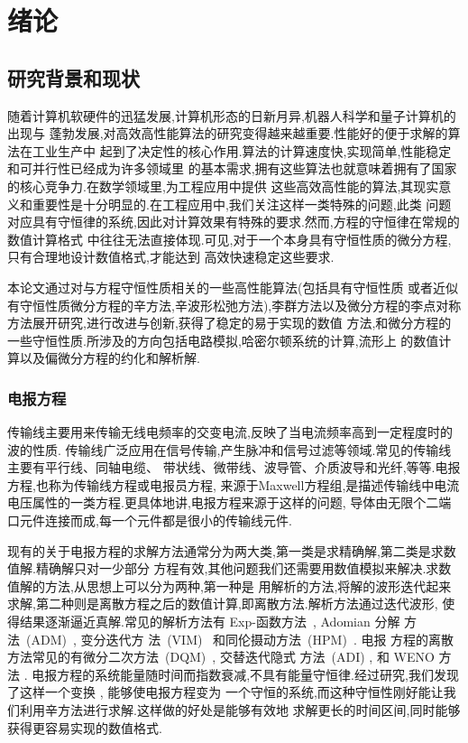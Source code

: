 \chapter{绪论}

\section{研究背景和现状}

随着计算机软硬件的迅猛发展,计算机形态的日新月异,机器人科学和量子计算机的出现与
蓬勃发展,对高效高性能算法的研究变得越来越重要.性能好的便于求解的算法在工业生产中
起到了决定性的核心作用.算法的计算速度快,实现简单,性能稳定和可并行性已经成为许多领域里
的基本需求,拥有这些算法也就意味着拥有了国家的核心竞争力.在数学领域里,为工程应用中提供
这些高效高性能的算法,其现实意义和重要性是十分明显的.在工程应用中,我们关注这样一类特殊的问题,此类
问题对应具有守恒律的系统,因此对计算效果有特殊的要求.然而,方程的守恒律在常规的数值计算格式
中往往无法直接体现.可见,对于一个本身具有守恒性质的微分方程,只有合理地设计数值格式,才能达到
高效快速稳定这些要求.

本论文通过对与方程守恒性质相关的一些高性能算法(包括具有守恒性质
或者近似有守恒性质微分方程的辛方法,辛波形松弛方法),李群方法以及微分方程的李点对称方法展开研究,进行改进与创新,获得了稳定的易于实现的数值
方法,和微分方程的一些守恒性质.所涉及的方向包括电路模拟,哈密尔顿系统的计算,流形上
的数值计算以及偏微分方程的约化和解析解.

\subsection{电报方程}

传输线主要用来传输无线电频率的交变电流,反映了当电流频率高到一定程度时的波的性质.
传输线广泛应用在信号传输,产生脉冲和信号过滤等领域.常见的传输线主要有平行线、同轴电缆、
带状线、微带线、波导管、介质波导和光纤,等等.电报方程,也称为传输线方程或电报员方程,
来源于Maxwell方程组,是描述传输线中电流电压属性的一类方程.更具体地讲,电报方程来源于这样的问题,
导体由无限个二端口元件连接而成,每一个元件都是很小的传输线元件.

现有的关于电报方程的求解方法通常分为两大类,第一类是求精确解,第二类是求数值解.精确解只对一少部分
方程有效,其他问题我们还需要用数值模拟来解决.求数值解的方法,从思想上可以分为两种,第一种是
用解析的方法,将解的波形迭代起来求解,第二种则是离散方程之后的数值计算,即离散方法.解析方法通过迭代波形,
使得结果逐渐逼近真解.常见的解析方法有 Exp-函数方法~\cite{naher2011exp}, Adomian 分解
方法~(ADM)~\cite{adomian1988areview,sheikholeslami2012analytical}, 变分迭代方
法~(VIM)~\cite{wu2013variational} 和同伦摄动方法~(HPM)~\cite{sheikholeslami2012homotopy}. 电报
方程的离散方法常见的有微分二次方法~(DQM)~\cite{jiwari2012numerical}, 交替迭代隐式
方法~(ADI) \cite{cui2013convergence}, 和 WENO 方法 \cite{borges2008improved,shen2014improvement}.
电报方程的系统能量随时间而指数衰减,不具有能量守恒律.经过研究,我们发现了这样一个变换 \cite{polyanin2001handbook}, 能够使电报方程变为
一个守恒的系统,而这种守恒性刚好能让我们利用辛方法进行求解.这样做的好处是能够有效地
求解更长的时间区间,同时能够获得更容易实现的数值格式.

